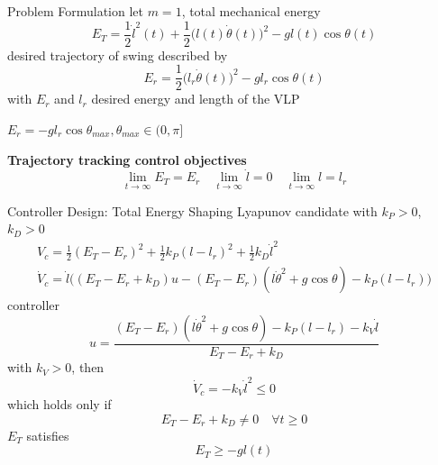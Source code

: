 \documentclass[10pt]{beamer}
\begin{document}
  \begin{frame}{Problem Formulation}
    let $m=1$, total mechanical energy
    \begin{equation*}
      E_T = %
        \frac{1}{2}\dot{l}^2(t)+\frac{1}{2}\big(l(t)\dot{\theta}(t)\big)^2-
        gl(t)\cos\theta(t) 
    \end{equation*}
    desired trajectory of swing described by
    \begin{equation*}
      E_r = \frac{1}{2}\big(l_r\dot{\theta}(t)\big)^2-gl_r\cos\theta(t) 
    \end{equation*}
    with $E_r$ and $l_r$ desired energy and length of the VLP
    
    \vspace{0.4cm}
    
    $E_r = -gl_r\cos\theta_{max}, \theta_{max} \in (0,\pi]$

    \vspace{0.1cm}
    \textbf{Trajectory tracking control objectives}
    \begin{equation*}
      \lim_{t\rightarrow \infty} E_T = E_r  \quad
      \lim_{t\rightarrow \infty} \dot{l} = 0 \quad
      \lim_{t\rightarrow \infty} l = l_r
    \end{equation*}
  \end{frame}

  \begin{frame}{Controller Design: Total Energy Shaping}
    Lyapunov candidate with $k_P>0$, $k_D>0$
    \begin{gather*}
      V_c = \frac{1}{2}(E_T-E_r)^2+\frac{1}{2}k_P(l-l_r)^2+
        \frac{1}{2}k_D\dot{l}^2 \\
      \dot{V}_c = \dot{l}\big((E_T-E_r+k_D)u-(E_T-E_r)(l\dot{\theta}^2+
        g\cos\theta)-k_P(l-l_r) \big)
    \end{gather*}
    controller
    \begin{equation*}
      u = \frac{(E_T-E_r)(l\dot{\theta}^2+g\cos\theta)-k_P(l-l_r)-
        k_V\dot{l}}{E_T-E_r+k_D}
    \end{equation*}
    with $k_V>0$, then
    \begin{equation*}
      \dot{V}_c = -k_V\dot{l}^2 \leq 0
    \end{equation*}
    which holds only if
    \begin{equation*}
      E_T-E_r+k_D  \neq 0 \quad \forall t\geq 0
    \end{equation*}
    $E_T$ satisfies
    \begin{equation*}
      E_T \geq -gl(t)
    \end{equation*}
  \end{frame}
\end{document}
